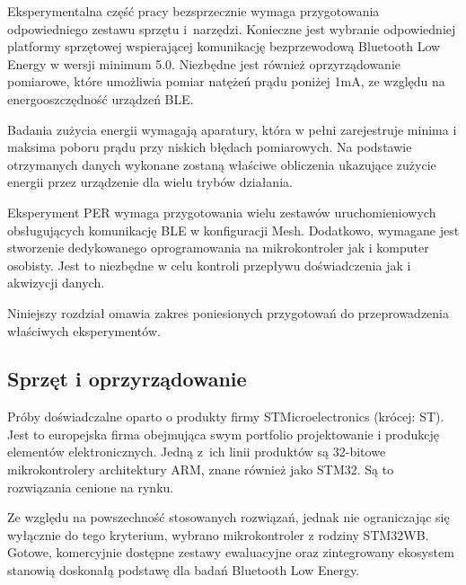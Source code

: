 Eksperymentalna część pracy bezsprzecznie wymaga przygotowania odpowiedniego zestawu
sprzętu i~narzędzi. Konieczne jest wybranie odpowiedniej platformy sprzętowej
wspierającej komunikację bezprzewodową Bluetooth Low Energy w wersji minimum 5.0.
Niezbędne jest również oprzyrządowanie pomiarowe, które umożliwia pomiar natężeń
prądu poniżej 1mA, ze względu na energooszczędność urządzeń \gls{BLE}.


Badania zużycia energii wymagają aparatury, która w pełni zarejestruje minima i maksima
poboru prądu przy niskich błędach pomiarowych. Na podstawie otrzymanych danych wykonane zostaną
właściwe obliczenia ukazujące zużycie energii przez urządzenie dla wielu trybów działania.

Eksperyment \gls{PER} wymaga przygotowania wielu zestawów uruchomieniowych obsługujących
komunikację BLE w konfiguracji Mesh. Dodatkowo, wymagane jest stworzenie dedykowanego oprogramowania
na mikrokontroler jak i komputer osobisty. Jest to niezbędne w celu kontroli przepływu
doświadczenia jak i akwizycji danych.

Niniejszy rozdział omawia zakres poniesionych przygotowań do przeprowadzenia 
właściwych eksperymentów.


\subsection{Sprzęt i oprzyrządowanie}


Próby doświadczalne oparto o produkty firmy STMicroelectronics (krócej: ST). Jest to europejska firma
obejmująca swym portfolio projektowanie i produkcję elementów elektronicznych. Jedną
z~ich linii produktów są 32-bitowe mikrokontrolery architektury ARM, znane również jako STM32.
Są to rozwiązania cenione na rynku.

Ze względu na powszechność stosowanych rozwiązań, jednak nie ograniczając się wyłącznie do tego kryterium,
wybrano mikrokontroler z rodziny STM32WB. Gotowe, komercyjnie dostępne zestawy ewaluacyjne oraz
zintegrowany ekosystem stanowią doskonałą podstawę dla badań Bluetooth Low Energy.


